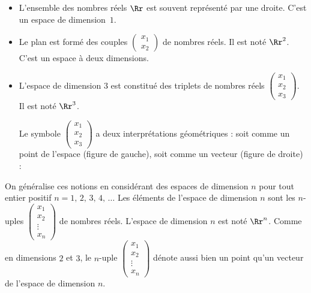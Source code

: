 \documentclass[class=report,crop=false]{standalone}
\begin{document}
\begin{itemize}
  \item L'ensemble des nombres
réels $\Rr$ est souvent représenté par une droite. C'est un
espace de dimension~$1$.

  \item Le plan est formé des couples
$\left(\begin{smallmatrix}x_1\\  x_2\end{smallmatrix}\right)$ de nombres réels.
Il est noté $\Rr^2$. C'est un espace à deux dimensions.

  \item L'espace de dimension $3$ est constitué des triplets de nombres réels
$\left(\begin{smallmatrix}x_1\\x_2\\x_3\end{smallmatrix}\right)$.
Il est noté $\Rr^3$.

Le symbole $\left(\begin{smallmatrix}x_1\\x_2\\x_3\end{smallmatrix}\right)$
a deux interprétations géométriques : soit comme un point de l'espace (figure de gauche),
soit comme un vecteur (figure de droite) :

\end{itemize}



\bigskip



On généralise ces notions en considérant des espaces de dimension $n$
pour tout entier positif $n = 1,\, 2,\, 3,\, 4,\, \dots$
Les éléments de l'espace de dimension $n$ sont les $n$-uples
$\left(\begin{smallmatrix} x_1\\ x_2 \\ \vdots \\ x_n \end{smallmatrix}\right)$
de nombres réels. L'espace de dimension $n$ est noté $\Rr^n$.
Comme en dimensions $2$ et $3$, le $n$-uple
$\left(\begin{smallmatrix} x_1\\x_2 \\  \vdots \\ x_n \end{smallmatrix}\right)$
dénote aussi bien un point qu'un vecteur de l'espace de dimension $n$.
\end{document}
